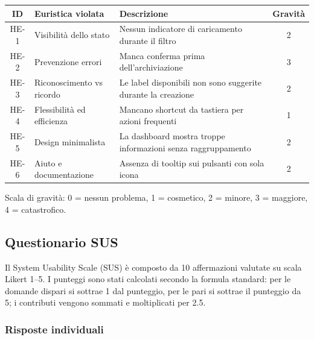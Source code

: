 ﻿\documentclass[a4paper,11pt]{article}
\begin{document}
\begin{tabularx}{\textwidth}{|c|>{\raggedright\arraybackslash}p{3.2cm}|>{\raggedright\arraybackslash}X|c|}
\hline
\textbf{ID} & \textbf{Euristica violata} & \textbf{Descrizione} & \textbf{Gravit\`a} \\
\hline
HE-1 & Visibilit\`a dello stato & Nessun indicatore di caricamento durante il filtro & 2 \\
\hline
HE-2 & Prevenzione errori & Manca conferma prima dell'archiviazione & 3 \\
\hline
HE-3 & Riconoscimento vs ricordo & Le label disponibili non sono suggerite durante la creazione & 2 \\
\hline
HE-4 & Flessibilit\`a ed efficienza & Mancano shortcut da tastiera per azioni frequenti & 1 \\
\hline
HE-5 & Design minimalista & La dashboard mostra troppe informazioni senza raggruppamento & 2 \\
\hline
HE-6 & Aiuto e documentazione & Assenza di tooltip sui pulsanti con sola icona & 2 \\
\hline
\end{tabularx}

\vspace{0.2cm}
\noindent Scala di gravit\`a: 0 = nessun problema, 1 = cosmetico, 2 = minore, 3 = maggiore, 4 = catastrofico.

\subsection{Questionario SUS}

Il System Usability Scale (SUS) \`e composto da 10 affermazioni valutate su scala Likert 1--5. I punteggi sono stati calcolati secondo la formula standard: per le domande dispari si sottrae 1 dal punteggio, per le pari si sottrae il punteggio da 5; i contributi vengono sommati e moltiplicati per 2.5.

\subsubsection{Risposte individuali}
\end{document}

